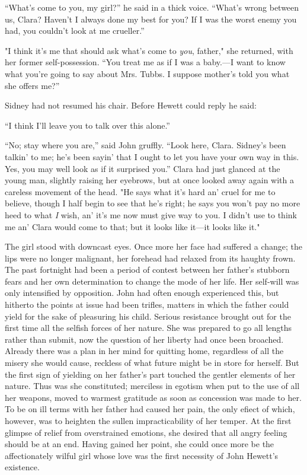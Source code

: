 ``What's come to you, my girl?'' he said in a thick voice. ``What's
wrong between us, Clara? Haven't I always done my best for you? If I was
the worst enemy you had, you couldn't look at me crueller.''

"I think it's me that should ask what's come to \emph{you}, father," she
returned, with her former self-possession. ``You treat me as if I was a
baby.---I want to know what you're going to say about Mrs. Tubbs. I
suppose mother's told you what she offers me?''

Sidney had not resumed his chair. Before Hewett could reply he said:

``I think I'll leave you to talk over this alone.''

``No; stay where you are,'' said John {}gruffly. ``Look here, Clara.
Sidney's been talkin' to me; he's been sayin' that I ought to let you
have your own way in this. Yes, you may well look as if it surprised
you.'' Clara had just glanced at the young man, slightly raising her
eyebrows, but at once looked away again with a careless movement of the
head. "He says what it's hard an' cruel for me to believe, though I half
begin to see that he's right; he says you won't pay no more heed to what
\emph{I} wish, an' it's me now must give way to you. I didn't use to
think me an' Clara would come to that; but it looks like it---it looks
like it."

The girl stood with downcast eyes. Once more her face had suffered a
change; the lips were no longer malignant, her forehead had relaxed from
its haughty frown. The past fortnight had been a period of contest
between her father's stubborn fears and her own determination to change
the mode of her life. Her self-will was only intensified by opposition.
John had often enough experienced this, but hitherto the points at
{}issue had been trifles, matters in which the father could yield for
the sake of pleasuring his child. Serious resistance brought out for the
first time all the selfish forces of her nature. She was prepared to go
all lengths rather than submit, now the question of her liberty had once
been broached. Already there was a plan in her mind for quitting home,
regardless of all the misery she would cause, reckless of what future
might be in store for herself. But the first sign of yielding on her
father's part touched the gentler elements of her nature. Thus was she
constituted; merciless in egotism when put to the use of all her
weapons, moved to warmest gratitude as soon as concession was made to
her. To be on ill terms with her father had caused her pain, the only
efiect of which, however, was to heighten the sullen impracticability of
her temper. At the first glimpse of relief from overstrained emotions,
she desired that all angry feeling should be at an end. Having gained
her point, she could once more be the {}affectionately wilful girl whose
love was the first necessity of John Hewett's existence.


